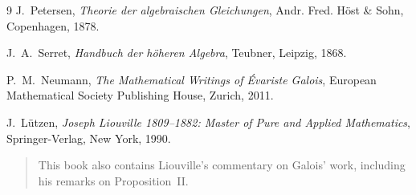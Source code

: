 \documentclass[a4paper,11pt]{article}
\begin{document}
\begin{thebibliography}{9}
	J.~Petersen,
	\textit{Theorie der algebraischen Gleichungen},
	Andr. Fred. Höst \& Sohn, Copenhagen, 1878.
	
	J.~A.~Serret,
	\textit{Handbuch der höheren Algebra},
	Teubner, Leipzig, 1868.
	
	P.~M.~Neumann,
	\textit{The Mathematical Writings of Évariste Galois},
	European Mathematical Society Publishing House,
	Zurich, 2011.
	
	J.~Lützen,
	\textit{Joseph Liouville 1809--1882: Master of Pure and Applied Mathematics},
	Springer-Verlag,
	New York, 1990.
	
	\begin{quote}
		This book also contains Liouville's commentary on Galois' work, including his remarks on Proposition~II.
	\end{quote}
	
\end{thebibliography}
\end{document}
